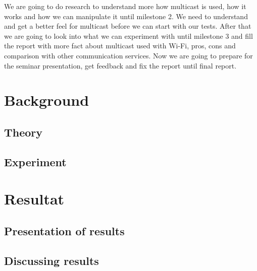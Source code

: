 \documentclass[10pt,a4paper]{article}
\begin{document}
We are going to do research to understand more how multicast is used, how it works and how we can manipulate it until milestone 2. We need to understand and get a better feel for multicast before we can start with our tests. After that we are going to look into what we can experiment with until milestone 3 and fill the report with more fact about multicast used with Wi-Fi, pros, cons and comparison with other communication services. Now we are going to prepare for the seminar presentation, get feedback and fix the report until final report.

\newpage

\section{Background}

\subsection{Theory}

\subsection{Experiment}

\newpage

\section{Resultat}

\subsection{Presentation of results}

\subsection{Discussing results}
\end{document}
